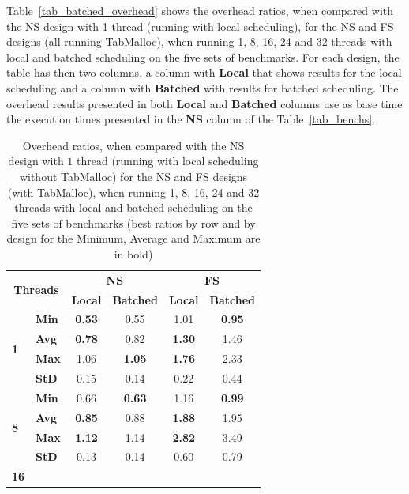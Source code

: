 \documentclass{llncs}
\begin{document}
Table~\ref{tab_batched_overhead} shows the overhead ratios, when
compared with the NS design with 1 thread (running with local
scheduling), for the NS and FS designs (all running TabMalloc), when
running 1, 8, 16, 24 and 32 threads with local and batched scheduling
on the five sets of benchmarks. For each design, the table has then
two columns, a column with {\bf Local} that shows results for the
local scheduling and a column with {\bf Batched} with results for
batched scheduling. The overhead results presented in both {\bf Local}
and {\bf Batched} columns use as base time the execution times
presented in the {\bf NS} column of the Table~\ref{tab_benchs}.

\setlength{\tabcolsep}{12pt}

\begin{table}[!ht]
\vspace{-\intextsep}
\centering
\caption{Overhead ratios, when compared with the NS design with $1$
  thread (running with local scheduling without TabMalloc) for the NS
  and FS designs (with TabMalloc), when running 1, 8, 16, 24 and 32
  threads with local and batched scheduling on the five sets of
  benchmarks (best ratios by row and by design for the Minimum,
  Average and Maximum are in bold)}
\vspace{-0.5\intextsep}
\begin{tabular}{ll|cc|cc}
\hline\hline
\multicolumn{2}{c|}{\multirow{2}{*}{\bf Threads}} &
\multicolumn{2}{c|}{\multirow{1}{*}{\bf NS}} &
\multicolumn{2}{|c}{\multirow{1}{*}{\bf FS}}\\ \cline{3-6}
& 
& \multicolumn{1}{c}{\bf Local}
& \multicolumn{1}{c}{\bf Batched}
& \multicolumn{1}{|c}{\bf Local}
& \multicolumn{1}{c}{\bf Batched}\\
\hline
\multirow{4}{*}{\bf 1}
& {\bf Min }& {\bf 0.53}& 0.55& 1.01& {\bf 0.95}\\
& {\bf Avg }& {\bf 0.78}& 0.82& {\bf 1.30}& 1.46\\
& {\bf Max }& 1.06& {\bf 1.05}& {\bf 1.76}& 2.33\\
& {\bf StD }& 0.15& 0.14& 0.22& 0.44\\
\hline
\multirow{4}{*}{\bf 8}
& {\bf Min }& 0.66& {\bf 0.63}& 1.16&{\bf  0.99}\\
& {\bf Avg }& {\bf 0.85}& 0.88& {\bf 1.88}& 1.95\\
& {\bf Max }& {\bf 1.12}& 1.14& {\bf 2.82}& 3.49\\
& {\bf StD }& 0.13& 0.14& 0.60& 0.79\\
\hline
\multirow{4}{*}{\bf 16}

\end{tabular}
\end{table}
\end{document}
